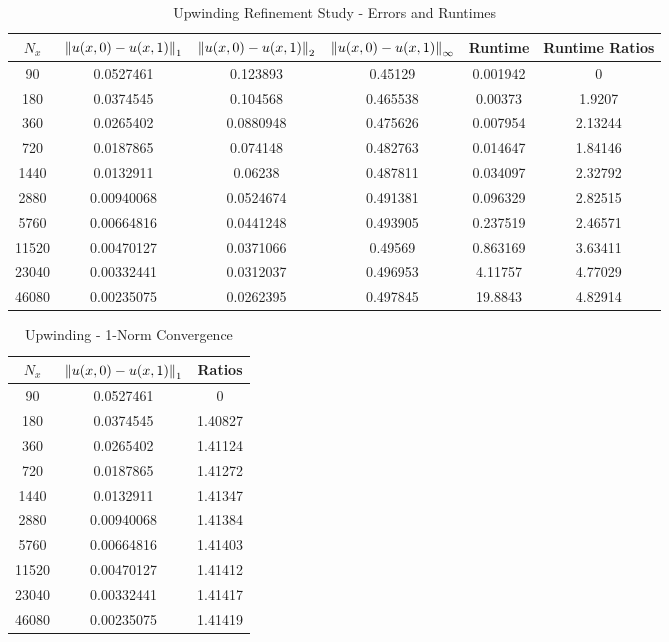 \documentclass[12pt]{article}
\begin{document}
\begin{table}[H]
\caption{Upwinding Refinement Study - Errors and Runtimes}
\centering\begin{tabular}{||c|ccc|cc||}
\hline \hline
    $N_x$ & $\norm{u(x,0)-u(x,1)}_1$ & $\norm{u(x,0)-u(x,1)}_2$ & $\norm{u(x,0)-u(x,1)}_{\infty}$ &   Runtime &   Runtime Ratios \\
\hline
    90 &     0.0527461  &      0.123893  &         0.45129  &  0.001942 &          0       \\
   180 &     0.0374545  &      0.104568  &         0.465538 &  0.00373  &          1.9207  \\
   360 &     0.0265402  &      0.0880948 &         0.475626 &  0.007954 &          2.13244 \\
   720 &     0.0187865  &      0.074148  &         0.482763 &  0.014647 &          1.84146 \\
  1440 &     0.0132911  &      0.06238   &         0.487811 &  0.034097 &          2.32792 \\
  2880 &     0.00940068 &      0.0524674 &         0.491381 &  0.096329 &          2.82515 \\
  5760 &     0.00664816 &      0.0441248 &         0.493905 &  0.237519 &          2.46571 \\
 11520 &     0.00470127 &      0.0371066 &         0.49569  &  0.863169 &          3.63411 \\
 23040 &     0.00332441 &      0.0312037 &         0.496953 &  4.11757  &          4.77029 \\
 46080 &     0.00235075 &      0.0262395 &         0.497845 & 19.8843   &          4.82914 \\
\hline \hline
\end{tabular}
\end{table}
\begin{minipage}{0.5\textwidth}
\begin{table}[H]
\caption{Upwinding - 1-Norm Convergence}
\centering\begin{tabular}{||c|cc||}
\hline \hline
    $N_x$ &   $\norm{u(x,0)-u(x,1)}_1$ &   Ratios \\
\hline
    90 &     0.0527461  &  0       \\
   180 &     0.0374545  &  1.40827 \\
   360 &     0.0265402  &  1.41124 \\
   720 &     0.0187865  &  1.41272 \\
  1440 &     0.0132911  &  1.41347 \\
  2880 &     0.00940068 &  1.41384 \\
  5760 &     0.00664816 &  1.41403 \\
 11520 &     0.00470127 &  1.41412 \\
 23040 &     0.00332441 &  1.41417 \\
 46080 &     0.00235075 &  1.41419 \\
\hline \hline
\end{tabular}
\end{table}
\end{minipage}%
\end{document}
